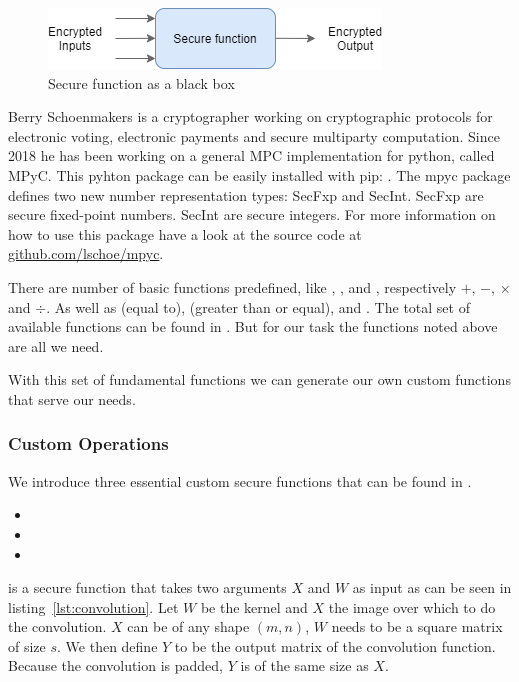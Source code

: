 \begin{figure}[H]
  \includegraphics[scale=0.8]{plots/blackbox.png}
  \centering
  \caption{Secure function as a black box}
  \label{fig:blackbox}
\end{figure}

Berry Schoenmakers is a cryptographer working on cryptographic protocols for electronic voting, electronic payments and secure multiparty computation. Since 2018 he has been working on a general MPC implementation for python, called MPyC. This pyhton package can be easily installed with pip: . The mpyc package defines two new number representation types: SecFxp and SecInt. SecFxp are secure fixed-point numbers. SecInt are secure integers. For more information on how to use this package have a look at the source code at \url{github.com/lschoe/mpyc}.

There are number of basic functions predefined, like , ,  and , respectively $+$, $-$, $\times$ and $\div$. As well as  (equal to),  (greater than or equal),  and . The total set of available functions can be found in . But for our task the functions noted above are all we need.

With this set of fundamental functions we can generate our own custom functions that serve our needs.

\subsubsection{Custom Operations}

We introduce three essential custom secure functions that can be found in .

\begin{itemize}
  \item {}
  \item {}
  \item {}
\end{itemize}

 is a secure function that takes two arguments $X$ and $W$ as input as can be seen in listing~\ref{lst:convolution}. Let $W$ be the kernel and $X$ the image over which to do the convolution. $X$ can be of any shape $(m, n)$, $W$ needs to be a square matrix of size $s$. We then define $Y$ to be the output matrix of the convolution function. Because the convolution is padded, $Y$ is of the same size as $X$.

